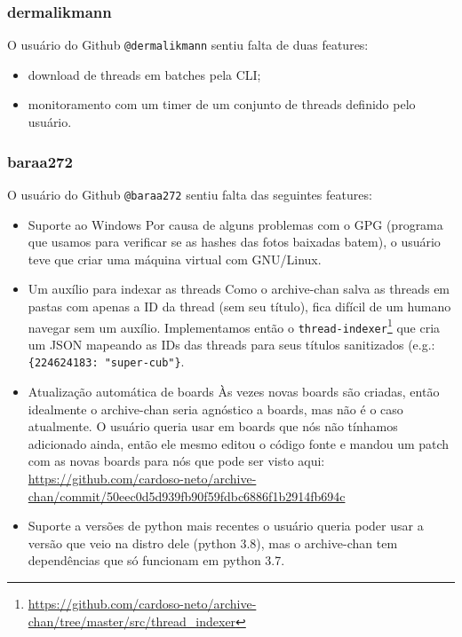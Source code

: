 \subsubsection{dermalikmann}

O usuário do Github \texttt{@dermalikmann} sentiu falta de duas features:

\begin{itemize}
    \item download de threads em batches pela CLI;
    \item monitoramento com um timer de um conjunto de threads definido pelo usuário.
\end{itemize} 

\subsubsection{baraa272}

O usuário do Github \texttt{@baraa272} sentiu falta das seguintes features:

\begin{itemize}
    \item Suporte ao Windows
        \subitem Por causa de alguns problemas com o GPG (programa que usamos para verificar se as hashes das fotos baixadas batem), o usuário teve que criar uma máquina virtual com GNU/Linux.
    \item Um auxílio para indexar as threads
        \subitem Como o archive-chan salva as threads em pastas com apenas a ID da thread (sem seu título), fica difícil de um humano navegar sem um auxílio.
        \subitem Implementamos então o \texttt{thread-indexer}\footnote{\url{https://github.com/cardoso-neto/archive-chan/tree/master/src/thread_indexer}} que cria um JSON mapeando as IDs das threads para seus títulos sanitizados (e.g.: \texttt{\{224624183: "super-cub"\}}.
    \item Atualização automática de boards
        \subitem Às vezes novas boards são criadas, então idealmente o archive-chan seria agnóstico a boards, mas não é o caso atualmente.
        \subitem O usuário queria usar em boards que nós não tínhamos adicionado ainda, então ele mesmo editou o código fonte e mandou um patch com as novas boards para nós que pode ser visto aqui: \url{https://github.com/cardoso-neto/archive-chan/commit/50eec0d5d939fb90f59fdbc6886f1b2914fb694c}
    \item Suporte a versões de python mais recentes
        \subitem o usuário queria poder usar a versão que veio na distro dele (python 3.8), mas o archive-chan tem dependências que só funcionam em python 3.7.
\end{itemize}

